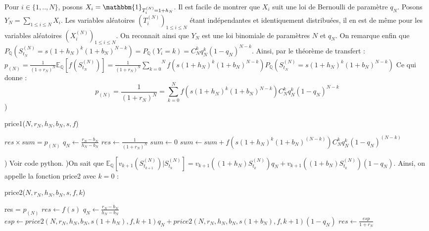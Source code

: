 \documentclass{exam}
\begin{document}
Pour $i \in \{1,..,N\}$, posons $X_i=\mathbbm{1}_{T_i^{(N)}=1+h_N}$. Il est facile de montrer que $X_i$ suit une loi de Bernoulli de paramètre $q_N$. Posons $Y_N=\underset{1 \leq i \leq N }{\sum}X_i$. Les variables aléatoires $(T_i^{(N)})_{1 \leq i \leq N}$ étant indépendantes et identiquement distribuées, il en est de même pour les variables aléatoires $(X_i^{(N)})_{1 \leq i \leq N}$. On reconnait ainsi que $Y_N$ est une loi binomiale de paramètres $N$ et $q_N$. On remarque enfin que $P_{\mathbb{Q}}(S_{t_N}^{(N)}=s(1+h_N)^k(1+b_N)^{N-k})=P_{\mathbb{Q}}(Y_i=k)=C_N^k q_N^k (1-q_N)^{N-k}$. Ainsi, par le théorème de transfert :
\newline
\espace
$p_{(N)}=\frac{1}{(1+r_N)^N}\mathbb{E}_{\mathbb{Q}}[f(S_{t_N}^{(N)})]=\frac{1}{(1+r_N)^N}\overset{N}{\underset{k=0}{\sum}}f(s(1+h_N)^k(1+b_N)^{N-k})P_{\mathbb{Q}}(S_{t_N}^{(N)}=s(1+h_N)^k(1+b_N)^{N-k})$
\newline
\espace
Ce qui donne :
$$\boxed{p_{(N)}=\frac{1}{(1+r_N)^N}=\overset{N}{\underset{k=0}{\sum}}f(s(1+h_N)^k(1+b_N)^{N-k})C_N^k q_N^k (1-q_N)^{N-k}}$$
\newline
{}) \begin{algorithm}
\caption{price1($N,r_N,h_N,b_N,s,f$)}
\begin{algorithmic}
\ENSURE $res \times sum = p_{(N)}$
\STATE $q_N \leftarrow \frac{r_N-b_N}{h_N-b_N}$
\STATE $res \leftarrow \frac{1}{(1+r_N)^N}$
\STATE $sum \leftarrow 0$
\STATE $sum \leftarrow sum + f(s(1+h_N)^k(1+b_N)^{(N-k)})C_N^kq_N^k(1-q_N)^{(N-k)}$
\ENDFOR
\end{algorithmic}
\end{algorithm}
\newline
{}) Voir code python.
\newline
{})On sait que $\mathbb{E}_\mathbb{Q}[v_{k+1}(S_{t_{k+1}}^{(N)})|S_{t_k}^{(N)}]=v_{k+1}((1+h_N)S_{t_k}^{(N)})q_N + v_{k+1}((1+b_N)S_{t_k}^{(N)})(1-q_N)$. Ainsi, on appelle la fonction price2 avec $k=0$ :
\begin{algorithm}
\caption{price2($N,r_N,h_N,b_N,s,f,k$)}
\begin{algorithmic}
\ENSURE res = $p_{(N)}$
\STATE $res \leftarrow f(s)$
\ELSE
\STATE $q_N \leftarrow \frac{r_N-b_N}{h_N-b_N}$
\STATE $esp \leftarrow price2(N,r_N,h_N,b_N,s(1+h_N),f,k+1)q_N + price2(N,r_N,h_N,b_N,s(1+b_N),f,k+1)(1-q_N)$
\STATE $res \leftarrow \frac{esp}{1+r_N}$
\ENDIF
\end{algorithmic}
\end{algorithm}
\newline
\end{document}
